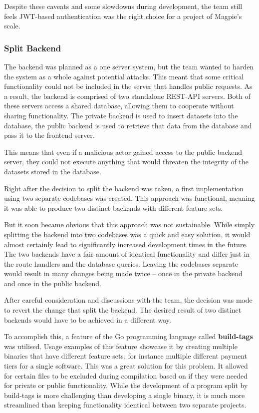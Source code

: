 Despite these caveats and some slowdowns during development, the team still
feels JWT-based authentication was the right choice for a project of Magpie's
scale.

\subsubsection{Split Backend}
The backend was planned as a one server system, but the team wanted to harden
the system as a whole against potential attacks. This meant that some critical
functionality could not be included in the server that handles public requests.
As a result, the backend is comprised of two standalone REST-API servers. Both
of these servers access a shared database, allowing them to cooperate without
sharing functionality. The private backend is used to insert datasets into the
database, the public backend is used to retrieve that data from the database and
pass it to the frontend server.

This means that even if a malicious actor gained access to the public backend
server, they could not execute anything that would threaten the integrity of the
datasets stored in the database.

Right after the decision to split the backend was taken, a first implementation
using two separate codebases was created. This approach was functional, meaning
it was able to produce two distinct backends with different feature sets.

But it soon became obvious that this approach was not sustainable. While simply
splitting the backend into two codebases was a quick and easy solution, it would
almost certainly lead to significantly increased development times in the
future. The two backends have a fair amount of identical functionality and
differ just in the route handlers and the database queries. Leaving the
codebases separate would result in many changes being made twice -- once in the
private backend and once in the public backend.

After careful consideration and discussions with the team, the decision was made
to revert the change that split the backend. The desired result of two distinct
backends would have to be achieved in a different way.

To accomplish this, a feature of the Go programming language called
\textbf{build-tags} was utilised. Usage examples of this feature showcase it by
creating multiple binaries that have different feature sets, for instance
multiple different payment tiers for a single software. This was a great
solution for this problem. It allowed for certain files to be excluded during
compilation based on if they were needed for private or public functionality.
While the development of a program split by build-tags is more challenging
than developing a single binary, it is much more streamlined than keeping
functionality identical between two separate projects.

